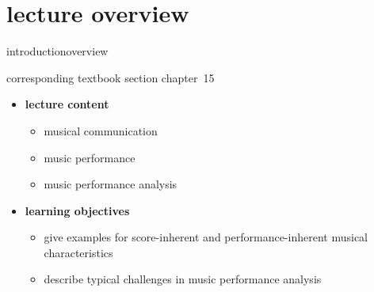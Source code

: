


\subtitle{module 15: music performance analysis}


	

    \section[overview]{lecture overview}
        \begin{frame}{introduction}{overview}
            \begin{block}{corresponding textbook section}
                    chapter~15
            \end{block}

            \begin{itemize}
                \item   \textbf{lecture content}
                    \begin{itemize}
                        \item   musical communication
                        \item   music performance
                        \item   music performance analysis
                    \end{itemize}
                \bigskip
                \item<2->   \textbf{learning objectives}
                    \begin{itemize}
                        \item   give examples for score-inherent and performance-inherent musical characteristics
                        \item   describe typical challenges in music performance analysis
                    \end{itemize}
            \end{itemize}
        \end{frame}

